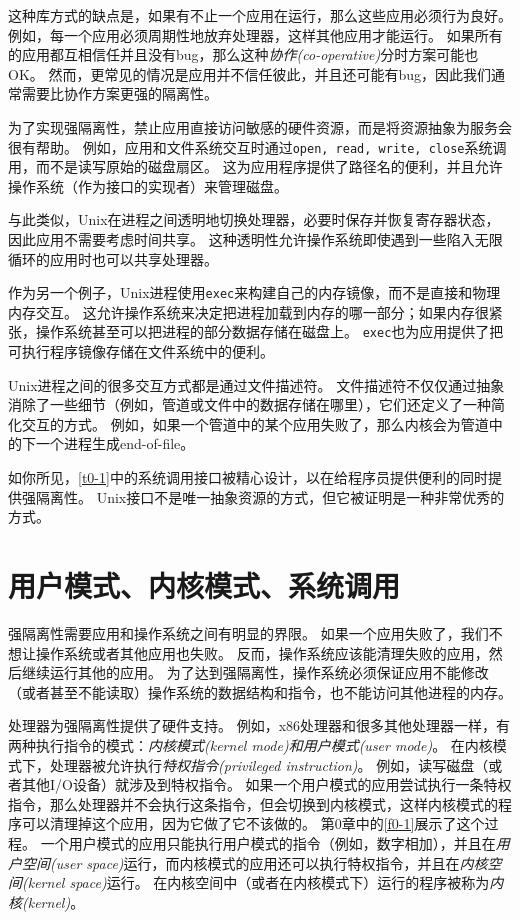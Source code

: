 这种库方式的缺点是，如果有不止一个应用在运行，那么这些应用必须行为良好。
例如，每一个应用必须周期性地放弃处理器，这样其他应用才能运行。
如果所有的应用都互相信任并且没有bug，那么这种\emph{协作(co-operative)}分时方案可能也OK。
然而，更常见的情况是应用并不信任彼此，并且还可能有bug，因此我们通常需要比协作方案更强的隔离性。

为了实现强隔离性，禁止应用直接访问敏感的硬件资源，而是将资源抽象为服务会很有帮助。
例如，应用和文件系统交互时通过\texttt{open, read, write, close}系统调用，而不是读写原始的磁盘扇区。
这为应用程序提供了路径名的便利，并且允许操作系统（作为接口的实现者）来管理磁盘。

与此类似，Unix在进程之间透明地切换处理器，必要时保存并恢复寄存器状态，因此应用不需要考虑时间共享。
这种透明性允许操作系统即使遇到一些陷入无限循环的应用时也可以共享处理器。

作为另一个例子，Unix进程使用\texttt{exec}来构建自己的内存镜像，而不是直接和物理内存交互。
这允许操作系统来决定把进程加载到内存的哪一部分；如果内存很紧张，操作系统甚至可以把进程的部分数据存储在磁盘上。
\texttt{exec}也为应用提供了把可执行程序镜像存储在文件系统中的便利。

Unix进程之间的很多交互方式都是通过文件描述符。
文件描述符不仅仅通过抽象消除了一些细节（例如，管道或文件中的数据存储在哪里），它们还定义了一种简化交互的方式。
例如，如果一个管道中的某个应用失败了，那么内核会为管道中的下一个进程生成end-of-file。

如你所见，\autoref{t0-1}中的系统调用接口被精心设计，以在给程序员提供便利的同时提供强隔离性。
Unix接口不是唯一抽象资源的方式，但它被证明是一种非常优秀的方式。

\section{用户模式、内核模式、系统调用}
强隔离性需要应用和操作系统之间有明显的界限。
如果一个应用失败了，我们不想让操作系统或者其他应用也失败。
反而，操作系统应该能清理失败的应用，然后继续运行其他的应用。
为了达到强隔离性，操作系统必须保证应用不能修改（或者甚至不能读取）操作系统的数据结构和指令，也不能访问其他进程的内存。

处理器为强隔离性提供了硬件支持。
例如，x86处理器和很多其他处理器一样，有两种执行指令的模式：\emph{内核模式(kernel mode)和\emph{用户模式(user mode)}}。
在内核模式下，处理器被允许执行\emph{特权指令(privileged instruction)}。
例如，读写磁盘（或者其他I/O设备）就涉及到特权指令。
如果一个用户模式的应用尝试执行一条特权指令，那么处理器并不会执行这条指令，但会切换到内核模式，这样内核模式的程序可以清理掉这个应用，因为它做了它不该做的。
第0章中的\autoref{f0-1}展示了这个过程。
一个用户模式的应用只能执行用户模式的指令（例如，数字相加），并且在\emph{用户空间(user space)}运行，而内核模式的应用还可以执行特权指令，并且在\emph{内核空间(kernel space)}运行。
在内核空间中（或者在内核模式下）运行的程序被称为\emph{内核(kernel)}。

